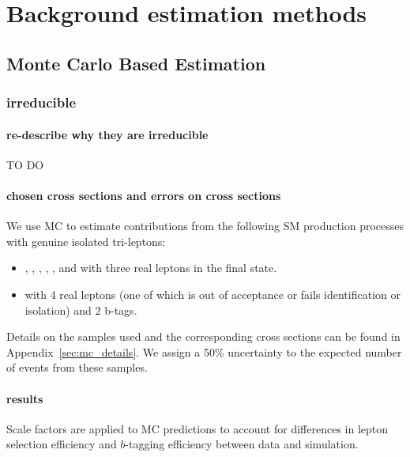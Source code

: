 \chapter{Background estimation methods}
	\section{Monte Carlo Based Estimation}
	\subsection{irreducible}
        		\subsubsection{re-describe why they are irreducible}
		TO DO
		
        		\subsubsection{chosen cross sections and errors on cross sections}
		We use MC to estimate contributions from the following SM production processes with genuine isolated tri-leptons:

\begin{itemize}
\item \WZZ, \ttWW, \ttW, \tbZ, \ttG, and \ttH with three real leptons in the final state.
\item \ZZZ with 4 real leptons (one of which is out of acceptance or fails identification or isolation) and 2 b-tags.
\end{itemize}




Details on the samples used and the corresponding cross sections can be found in Appendix~\ref{sec:mc_details}.  
We assign a 50\% uncertainty to the expected number of events from these samples.
		
		\subsubsection{results}
		
Scale factors are applied to MC predictions to account for differences in lepton selection efficiency and $b$-tagging efficiency between data and simulation.


